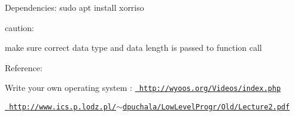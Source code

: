 Dependencies\+: sudo apt install xorriso

caution\+:
\begin{DoxyEnumerate}
\item make sure correct data type and data length is passed to function call
\end{DoxyEnumerate}

Reference\+:
\begin{DoxyEnumerate}
\item Write your own operating system \+: \href{http://wyoos.org/Videos/index.php}{\texttt{ http\+://wyoos.\+org/\+Videos/index.\+php}}
\item \href{http://www.ics.p.lodz.pl/~dpuchala/LowLevelProgr/Old/Lecture2.pdf}{\texttt{ http\+://www.\+ics.\+p.\+lodz.\+pl/$\sim$dpuchala/\+Low\+Level\+Progr/\+Old/\+Lecture2.\+pdf}} 
\end{DoxyEnumerate}